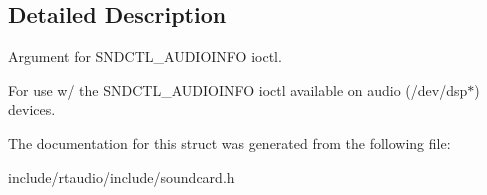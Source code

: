 \subsection{Detailed Description}
Argument for S\+N\+D\+C\+T\+L\+\_\+\+A\+U\+D\+I\+O\+I\+N\+FO ioctl. 

For use w/ the S\+N\+D\+C\+T\+L\+\_\+\+A\+U\+D\+I\+O\+I\+N\+FO ioctl available on audio (/dev/dsp$\ast$) devices. 

The documentation for this struct was generated from the following file\+:\begin{DoxyCompactItemize}
\item 
include/rtaudio/include/soundcard.\+h\end{DoxyCompactItemize}
